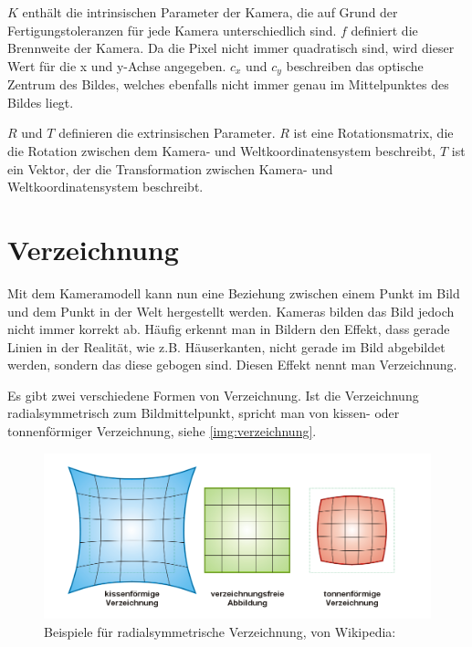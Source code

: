 $K$ enthält die intrinsischen Parameter der Kamera, die auf Grund der Fertigungstoleranzen für jede Kamera unterschiedlich sind. $f$ definiert die Brennweite der Kamera. Da die Pixel nicht immer quadratisch sind, wird dieser Wert für die x und y-Achse angegeben. $c_x$ und $c_y$ beschreiben das optische Zentrum des Bildes, welches ebenfalls nicht immer genau im Mittelpunktes des Bildes liegt.

$R$ und $T$ definieren die extrinsischen Parameter. $R$ ist eine Rotationsmatrix, die die Rotation zwischen dem Kamera- und Weltkoordinatensystem beschreibt, $T$ ist ein Vektor, der die Transformation zwischen Kamera- und Weltkoordinatensystem beschreibt.

\section{Verzeichnung}
\label{sec:verzeichnung}
Mit dem Kameramodell kann nun eine Beziehung zwischen einem Punkt im Bild und dem Punkt in der Welt hergestellt werden. Kameras bilden das Bild jedoch nicht immer korrekt ab. Häufig erkennt man in Bildern den Effekt, dass gerade Linien in der Realität, wie z.B. Häuserkanten, nicht gerade im Bild abgebildet werden, sondern das diese gebogen sind. Diesen Effekt nennt man Verzeichnung.

Es gibt zwei verschiedene Formen von Verzeichnung. Ist die Verzeichnung radialsymmetrisch zum Bildmittelpunkt, spricht man von kissen- oder tonnenförmiger Verzeichnung, siehe \autoref{img:verzeichnung}.
\begin{figure}[!hbt]
	\centering
	\vspace{1ex}
	\includegraphics[scale=3]{../images/Verzeichnung}
	\caption[Beispiele für radialsymmetrische Verzeichnung, von Wikipedia: \cite{wiki:verzeichnung}]{\label{img:verzeichnung}Beispiele für radialsymmetrische Verzeichnung, von Wikipedia: \cite{wiki:verzeichnung}}
	\vspace{1ex}
\end{figure}

